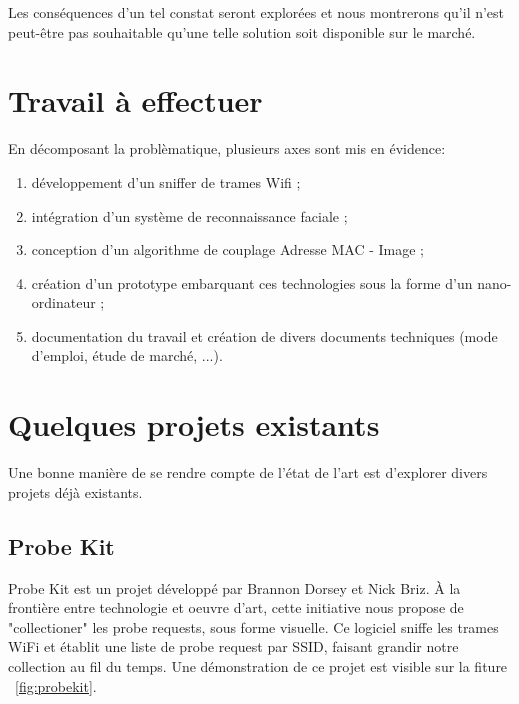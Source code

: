Les conséquences d'un tel constat seront explorées et nous montrerons qu'il n'est peut-être pas souhaitable qu'une telle solution soit disponible sur le marché.  

\section{Travail à effectuer}

En décomposant la problèmatique, plusieurs axes sont mis en évidence:
\begin{enumerate}
\item développement d'un sniffer de trames Wifi ;
\item intégration d'un système de reconnaissance faciale ;
\item conception d'un algorithme de couplage Adresse MAC - Image ;
\item création d'un prototype embarquant ces technologies sous la forme d'un nano-ordinateur ;
\item documentation du travail et création de divers documents techniques (mode d'emploi, étude de marché, ...).
\end{enumerate}

\section{Quelques projets existants}
Une bonne manière de se rendre compte de l'état de l'art est d'explorer divers projets déjà existants.

\subsection{Probe Kit}

Probe Kit est un projet développé par Brannon Dorsey et Nick Briz. À la frontière entre technologie et oeuvre d'art, cette initiative nous propose de "collectioner" les
probe requests, sous forme visuelle. 
Ce logiciel sniffe les trames WiFi et établit une liste de probe request par SSID, faisant grandir notre collection au fil du temps.
Une démonstration de ce projet est visible sur la fiture ~\ref{fig:probekit}.

